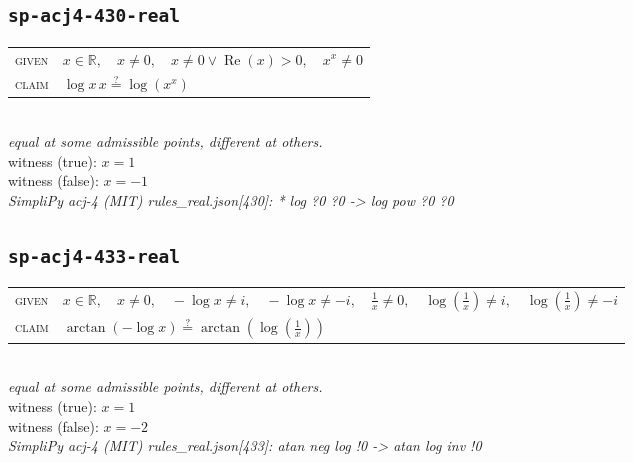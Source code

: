 \documentclass[11pt]{article}
\begin{document}
\subsection*{\texttt{sp-acj4-430-real}}
\begin{tabular}{@{}l@{\quad}l@{}}
\textsc{given} & $x \in \mathbb{R},\quad x \neq 0,\quad x \neq 0 \lor \operatorname{Re}\left(x\right) > 0,\quad x^{x} \neq 0$ \\[4pt]
\textsc{claim} & $\displaystyle \log x \, x \overset{?}{=} \log\left(x^{x}\right)$ \\
\end{tabular}\\[2pt]
{\small\emph{equal at some admissible points, different at others.}}\\
{\footnotesize\color{gray}witness (true): $x = 1$}\\
{\footnotesize\color{gray}witness (false): $x = -1$}\\
\emph{SimpliPy acj-4 (MIT) rules\_real.json[430]: * log ?0 ?0  ->  log pow ?0 ?0}\\

\subsection*{\texttt{sp-acj4-433-real}}
\begin{tabular}{@{}l@{\quad}l@{}}
\textsc{given} & $x \in \mathbb{R},\quad x \neq 0,\quad -\log x \neq i,\quad -\log x \neq -i,\quad \frac{1}{x} \neq 0,\quad \log\left(\frac{1}{x}\right) \neq i,\quad \log\left(\frac{1}{x}\right) \neq -i$ \\[4pt]
\textsc{claim} & $\displaystyle \arctan\left(-\log x\right) \overset{?}{=} \arctan\left(\log\left(\frac{1}{x}\right)\right)$ \\
\end{tabular}\\[2pt]
{\small\emph{equal at some admissible points, different at others.}}\\
{\footnotesize\color{gray}witness (true): $x = 1$}\\
{\footnotesize\color{gray}witness (false): $x = -2$}\\
\emph{SimpliPy acj-4 (MIT) rules\_real.json[433]: atan neg log !0  ->  atan log inv !0}\\
\end{document}
